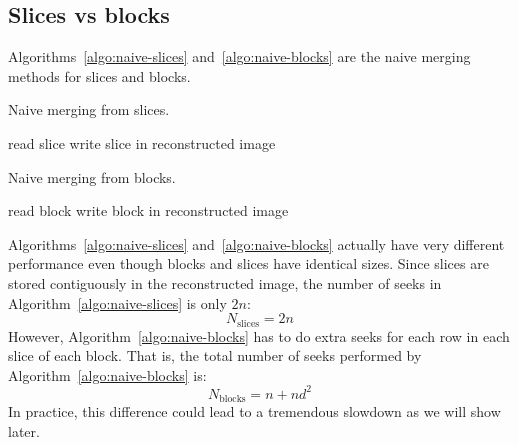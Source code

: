 \documentclass[10pt, conference, compsocconf]{IEEEtran}
\begin{document}
\subsection{Slices vs blocks}

Algorithms~\ref{algo:naive-slices} and~\ref{algo:naive-blocks} are the
naive merging methods for slices and blocks.
\begin{algorithm}[h]
\caption{Naive merging from slices.}
\label{algo:naive-slices} 
\begin{algorithmic}
    \STATE read slice
    \STATE write slice in reconstructed image
  \ENDFOR      
\end{algorithmic}
\end{algorithm}

\begin{algorithm}[h]
\caption{Naive merging from blocks.}
\label{algo:naive-blocks}
\begin{algorithmic}
    \STATE read block
    \STATE write block in reconstructed image
  \ENDFOR 
\end{algorithmic}
\end{algorithm}

Algorithms~\ref{algo:naive-slices} and~\ref{algo:naive-blocks}
actually have very different performance even though blocks and slices
have identical sizes. Since slices are stored contiguously in the
reconstructed image, the number of seeks in
Algorithm~\ref{algo:naive-slices} is only $2n$:
\begin{equation}
  N_\mathrm{slices} = 2n 
\end{equation}
However,
Algorithm~\ref{algo:naive-blocks} has to do extra seeks for each row
in each slice of each block. That is, the total number of seeks
performed by Algorithm~\ref{algo:naive-blocks} is:
\begin{equation}
N_\mathrm{blocks} = n+nd^2 
\end{equation}
In
practice, this difference could lead to a tremendous slowdown as we will show
later.

\end{document}
